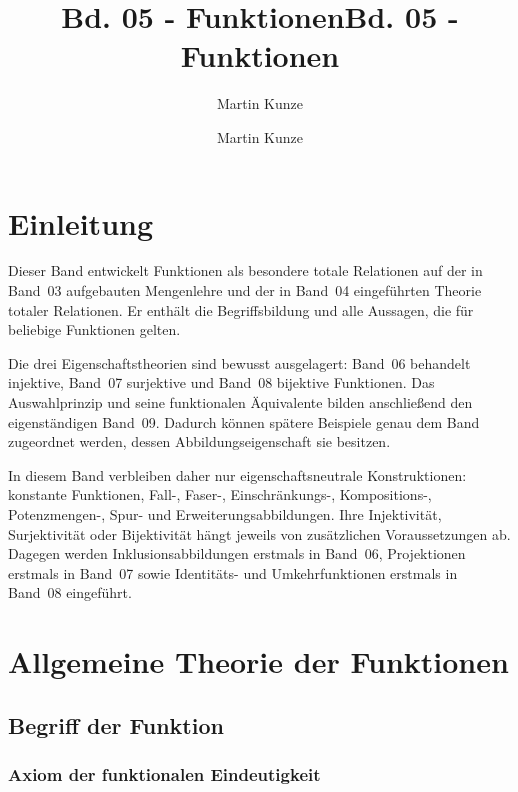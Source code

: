 \documentclass[main.tex]{subfiles}
\title{Bd. 05 - Funktionen}
\author{Martin Kunze}
\date{}
\begin{document}
\title{Bd. 05 - Funktionen}
\author{Martin Kunze}
\date{}
\hypersetup{pageanchor=false}
\maketitle
\hypersetup{pageanchor=true}
\setcounter{tocdepth}{3}
\tableofcontents
\setcounter{file}{5}
\renewcommand{\FormulaBandID}{5}

\chapter{Einleitung}

Dieser Band entwickelt Funktionen als besondere totale Relationen auf der in
Band~03 aufgebauten Mengenlehre und der in Band~04 eingeführten Theorie
totaler Relationen. Er enthält die Begriffsbildung und alle Aussagen, die für
beliebige Funktionen gelten.

Die drei Eigenschaftstheorien sind bewusst ausgelagert: Band~06 behandelt
injektive, Band~07 surjektive und Band~08 bijektive Funktionen. Das
Auswahlprinzip und seine funktionalen Äquivalente bilden anschließend den
eigenständigen Band~09. Dadurch können spätere Beispiele genau dem Band
zugeordnet werden, dessen Abbildungseigenschaft sie besitzen.

In diesem Band verbleiben daher nur eigenschaftsneutrale Konstruktionen:
konstante Funktionen, Fall-, Faser-, Einschränkungs-, Kompositions-,
Potenzmengen-, Spur- und Erweiterungsabbildungen. Ihre Injektivität,
Surjektivität oder Bijektivität hängt jeweils von zusätzlichen Voraussetzungen
ab. Dagegen werden Inklusionsabbildungen erstmals in Band~06, Projektionen
erstmals in Band~07 sowie Identitäts- und Umkehrfunktionen erstmals in Band~08
eingeführt.

\chapter{Allgemeine Theorie der Funktionen}

\section{Begriff der Funktion}

\subsection{Axiom der funktionalen Eindeutigkeit}

{
}
\end{document}
